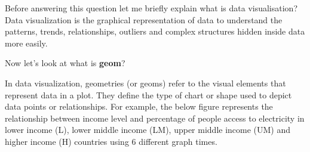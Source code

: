 \documentclass[
  letterpaper,
  DIV=11,
  numbers=noendperiod]{scrreprt}
\begin{document}

Before answering this question let me briefly explain what is data
visualisation? Data visualization is the graphical representation of
data to understand the patterns, trends, relationships, outliers and
complex structures hidden inside data more easily.

Now let's look at what is \textbf{geom}?

In data visualization, geometries (or geoms) refer to the visual
elements that represent data in a plot. They define the type of chart or
shape used to depict data points or relationships. For example, the
below figure represents the relationship between income level and
percentage of people access to electricity in lower income (L), lower
middle income (LM), upper middle income (UM) and higher income (H)
countries using 6 different graph times.
\end{document}
